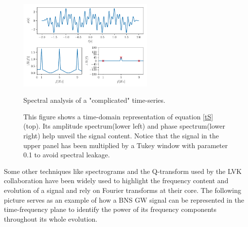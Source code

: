 \begin{figure}[hbt!]
\begin{center}
\includegraphics[width=0.6\textwidth, angle=0]{images/Data_analysis/sig_proc/2_1.pdf}
\captionsetup{width=0.8\textwidth}
\caption{Spectral analysis of a "complicated" time-series.}
\caption*{This figure shows a time-domain representation of equation \ref{tS}(top). Its amplitude spectrum(lower left) and phase spectrum(lower right) help unveil the signal content. Notice that the signal in the upper panel has been multiplied by a Tukey window with parameter 0.1 to avoid spectral leakage.}
\label{fig:1}
\end{center}
\end{figure}

\FloatBarrier



Some other techniques like spectrograms and the Q-transform used by the LVK collaboration \cite{LIGOScientific:2017vwq} have been widely used to highlight the frequency content and evolution of a signal and rely on Fourier transforms at their core. The following picture serves as an example of how a BNS GW signal can be represented in the time-frequency plane to identify the power of its frequency components throughout its whole evolution.


